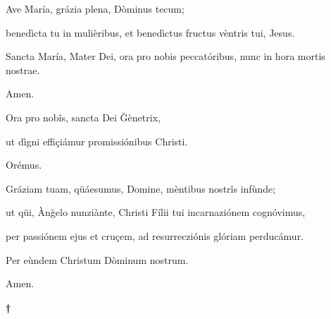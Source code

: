 \documentclass[twoside,10pt]{article}
\begin{document}
{  \noindent Ave María, grázia plena, Dòminus tecum;
  
  benedìcta tu in mulièribus, et benedìctus fructus vèntris tui, Jesus.

  Sancta María, Mater Dei, ora pro nobis peccatóribus, nunc in hora mortis nostrae.

  Amen.

  \bigskip

   Ora pro nobîs, sancta Dei Ğènetrix,

  \smallskip

   ut dìgni effiçiámur promissiónibus Christi.

  \bigskip

   Orémus.

  \bigskip

  \noindent Gráziam tuam, qüáesumus, Domine, mèntibus nostrîs infùnde;

  ut qüi, Ànğelo nunziànte, Christi Fílii tui incarnaziónem cognóvimus,

  per passiónem ejus et cruçem, ad resurrecziónis glóriam perducámur.

  Per eùndem Christum Dòminum nostrum.

  \bigskip

   Amen.

  \bigskip
  \medskip

  \begin{center}
  {\bfseries\large †}
  \end{center}

}
\end{document}
